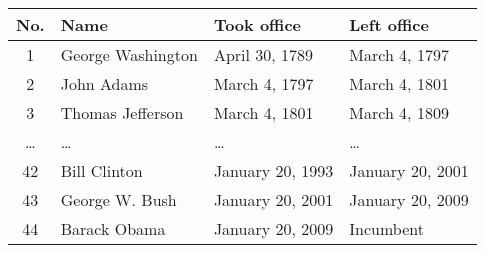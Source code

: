 \begin{tabular}{c|lll}
	No. & Name & Took office & Left office\\
	\hline\hline
	1 & George Washington & April 30, 1789 & March 4, 1797\\
	2 & John Adams & March 4, 1797 & March 4, 1801\\
	3 & Thomas Jefferson & March 4, 1801 & March 4, 1809\\
	\ldots & \ldots & \ldots & \ldots\\
	42 & Bill Clinton & January 20, 1993 & January 20, 2001\\
	43 & George W. Bush & January 20, 2001 & January 20, 2009\\
	44 & Barack Obama & January 20, 2009 & Incumbent\\
\end{tabular}
